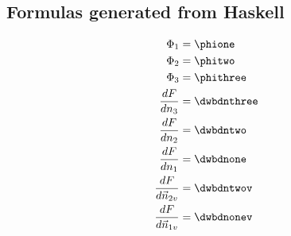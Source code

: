 \documentclass[letterpaper,twocolumn,amsmath,amssymb,jcp,10pt,aip]{revtex4-1}
\begin{document}
\begin{widetext}
\section{Formulas generated from Haskell}


\begin{align}
  \Phi_1 &= \phione \\
  \Phi_2 &= \phitwo \\
  \Phi_3 &= \phithree \\
  \frac{d F}{dn_3} &= \dwbdnthree \\
  \frac{d F}{dn_2} &= \dwbdntwo \\
  \frac{d F}{dn_1} &= \dwbdnone \\
  \frac{d F}{d\vec{n}_{2v}} &= \dwbdntwov \\
  \frac{d F}{d\vec{n}_{1v}} &= \dwbdnonev
\end{align}

\end{widetext}

\end{document}
